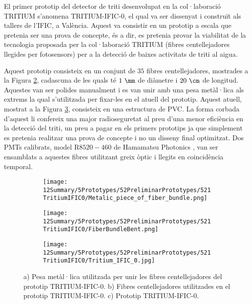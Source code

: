 El primer prototip del detector de triti desenvolupat en la col·laboració TRITIUM s'anomena TRITIUM-IFIC-0, el qual va ser dissenyat i construït als tallers de l'IFIC, a València. Aquest va consistir en un prototip a escala que pretenia ser una prova de concepte, és a dir, es pretenia provar la viabilitat de la tecnologia proposada per la col·laboració TRITIUM (fibres centellejadores llegides per fotosensors) per a la detecció de baixes activitats de triti al aigua.

Aquest prototip consisteix en un conjunt de $35$ fibres centellejadores, mostrades a la Figura \ref{subfig:FibresDobladesTritiumIFIC0}, cadascuna de les quals té $1~\mm$ de diàmetre i $20~\cm$ de longitud. Aquestes van ser polides manualment i es van unir amb una pesa metàl·lica als extrems la qual s'utilitzada per fixar-les en el atuell del prototip. Aquest atuell, mostrat a la Figura \ref{subfig:PrototipTritiumIFIC0}, consisteix en una estructura de PVC. La forma corbada d'aquest li confereix una major radioseguretat al preu d'una menor eficiència en la detecció del triti, un preu a pagar en els primers prototips ja que simplement es pretenia realitzar una prova de concepte i no un disseny final optimitzat. Dos PMTs calibrats, model R$8520-460$ de Hamamatsu Photonics \cite{DataSheetPMTs}, van ser ensamblats a aquestes fibres utilitzant greix òptic \cite{OpticalGrease} i llegits en coincidència temporal.

\begin{figure}
\centering
    \begin{subfigure}[b]{0.5\textwidth}
    \centering
    \texttt{[image: 12Summary/5Prototypes/52PreliminarPrototypes/521TritiumIFIC0/Metalic\_piece\_of\_fiber\_bundle.png]}  
    \caption{\label{subfig:PesaMetalicaFibresTritiumIFIC0}}
    \end{subfigure}
    \hfill
    \begin{subfigure}[b]{0.4\textwidth}
    \centering
    \texttt{[image: 12Summary/5Prototypes/52PreliminarPrototypes/521TritiumIFIC0/FiberBundleBent.png]}  
    \caption{\label{subfig:FibresDobladesTritiumIFIC0}}
    \end{subfigure}
    \hfill
    \begin{subfigure}[b]{0.7\textwidth}
    \centering
    \texttt{[image: 12Summary/5Prototypes/52PreliminarPrototypes/521TritiumIFIC0/Tritium\_IFIC\_0.jpg]}  
    \caption{\label{subfig:PrototipTritiumIFIC0}}
    \end{subfigure}
 \caption{a) Pesa metàl·lica utilitzada per unir les fibres centellejadores del prototip TRITIUM-IFIC-0. b) Fibres centellejadores utilitzades en el prototip TRITIUM-IFIC-0. c) Prototip TRITIUM-IFIC-0.} \label{fig:TritiumIFIC0s}
\end{figure}

